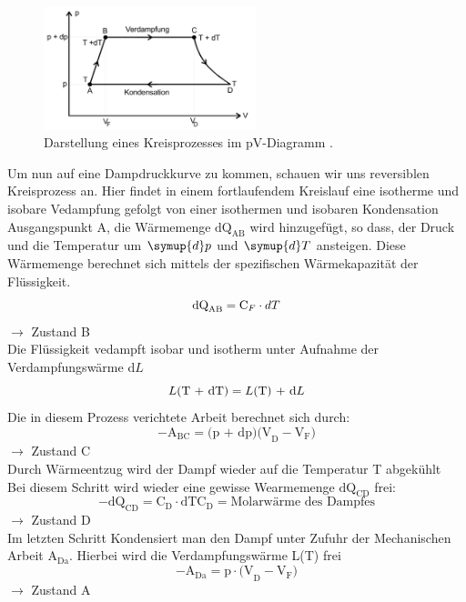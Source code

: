 \begin{figure}[H]
    \centering
    \includegraphics[width=0.55\textwidth]{images/Kreislauf.PNG}
    \caption{Darstellung eines Kreisprozesses im pV-Diagramm \protect \cite{V203}.}
    \label{img:Kreislauf}
\end{figure}
Um nun auf eine Dampdruckkurve zu kommen, schauen wir uns reversiblen Kreisprozess an. Hier findet in einem fortlaufendem 
Kreislauf eine isotherme und isobare Vedampfung gefolgt von einer isothermen und isobaren Kondensation
Ausgangspunkt A, die Wärmemenge $\text{dQ}_\text{AB} $ wird hinzugefügt, so dass, der Druck und die Temperatur um $\symup{d}p$ und $\symup{d}T$ ansteigen.
Diese Wärmemenge berechnet sich mittels der spezifischen Wärmekapazität der Flüssigkeit.
\begin{equation}
    \text{dQ}_\text{AB}= \text{C}_F \cdot dT \nonumber\\
\end{equation}
$\rightarrow$ Zustand B\\
Die Flüssigkeit vedampft isobar und isotherm unter Aufnahme der Verdampfungswärme d$L$\\
\begin{equation}
L\text{(T + dT)} = L\text{(T) + d}L\nonumber\\
\end{equation}
Die in diesem Prozess verichtete Arbeit berechnet sich durch:\\
\begin{equation}
   - \text{A}_\text{BC} = \text{(p + dp)(V}_\text{D} - \text{V}_\text{F}\text{)} 
\end{equation}
$\rightarrow$ Zustand C\\
Durch Wärmeentzug wird der Dampf wieder auf die Temperatur T abgekühlt \\
Bei diesem Schritt wird wieder eine gewisse Wearmemenge $\text{dQ}_\text{CD}$ frei:
\begin{equation}
 -\text{dQ}_\text{CD} = \text{C}_\text{D}\cdot \text{dT} \text{C}_\text{D} = \text{Molarwärme des Dampfes}   
\end{equation}
$\rightarrow$ Zustand D\\
Im letzten Schritt Kondensiert man den Dampf unter Zufuhr der Mechanischen Arbeit $\text{A}_\text{Da}$.
Hierbei wird die Verdampfungswärme L(T) frei\\ 
\begin{equation}
    -\text{A}_\text{Da}= \text{p}\cdot\text{(V}_\text{D} - \text{V}_\text{F}\text{)}
\end{equation}
$\rightarrow$ Zustand A\\

